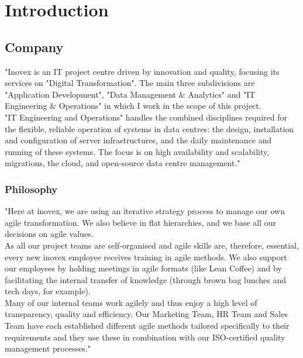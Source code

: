 \section{Introduction}
\subsection{Company}
"Inovex is an IT project centre driven by innovation and quality, focusing its services on "Digital Transformation". The main three subdivisions are "Application Development", "Data Management \& Analytics" and "IT Engineering \& Operations" in which I work in the scope of this project.\\
"IT Engineering and Operations" handles the combined disciplines required for the flexible, reliable operation of systems in data centres: the design, installation and configuration of server infrastructures, and the daily maintenance and running of these systems. The focus is on high availability and scalability, migrations, the cloud, and open-source data centre management."\cite{inovex}

\subsubsection{Philosophy}
"Here at inovex, we are using an iterative strategy process to manage our own agile transformation. We also believe in flat hierarchies, and we base all our decisions on agile values.\\
As all our project teams are self-organised and agile skills are, therefore, essential, every new inovex employee receives training in agile methods. We also support our employees by holding meetings in agile formats (like Lean Coffee) and by facilitating the internal transfer of knowledge (through brown bag lunches and tech days, for example).\\
Many of our internal teams work agilely and thus enjoy a high level of transparency, quality and efficiency. Our Marketing Team, HR Team and Sales Team have each established different agile methods tailored specifically to their requirements and they use these in combination with our ISO-certified quality management processes."\cite{inovex}

